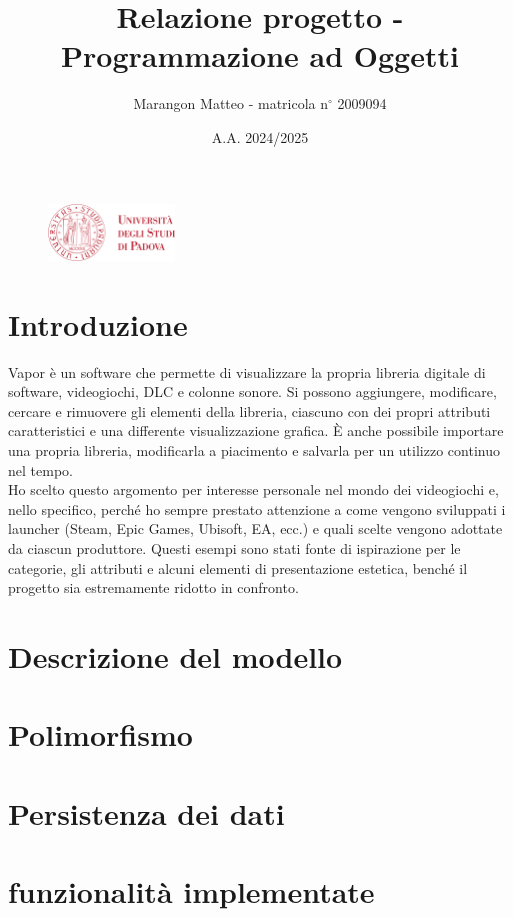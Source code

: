 \documentclass[10pt]{article}
\title{Relazione progetto - Programmazione ad Oggetti}
\author{Marangon Matteo - matricola n$^{\circ}$ 2009094}
\date{A.A. 2024/2025}
\begin{document}
\begin{figure}
    \centering
    \includegraphics[width=0.3\textwidth]{./unipdlogo.png}
\end{figure}
\maketitle

\newpage

\tableofcontents  %
\newpage

\section{Introduzione} %
Vapor è un software che permette di visualizzare la propria libreria digitale di software, videogiochi, DLC e colonne sonore. Si possono aggiungere, modificare, cercare e rimuovere gli elementi della libreria, ciascuno con dei propri attributi caratteristici e una differente visualizzazione grafica. È anche possibile importare una propria libreria, modificarla a piacimento e salvarla per un utilizzo continuo nel tempo.
\\Ho scelto questo argomento per interesse personale nel mondo dei videogiochi e, nello specifico, perché ho sempre prestato attenzione a come vengono sviluppati i launcher (Steam, Epic Games, Ubisoft, EA, ecc.) e quali scelte vengono adottate da ciascun produttore. Questi esempi sono stati fonte di ispirazione per le categorie, gli attributi e alcuni elementi di presentazione estetica, benché il progetto sia estremamente ridotto in confronto.
\section{Descrizione del modello}
\section{Polimorfismo}
\section{Persistenza dei dati}
\section{funzionalità implementate}
\end{document}
